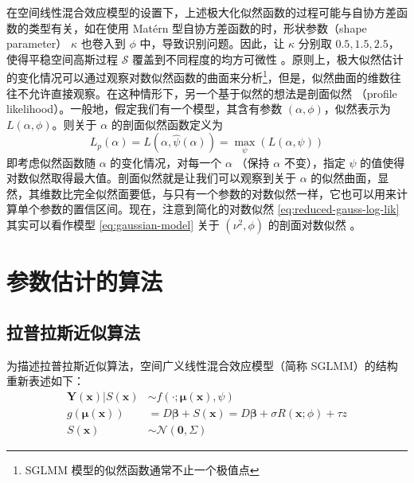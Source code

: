 \documentclass[12pt,a4paper,UTF8,twoside]{book}
\theoremstyle{definition}
\theoremstyle{definition}
\theoremstyle{definition}
\theoremstyle{remark}
\begin{document}
在空间线性混合效应模型的设置下，上述极大化似然函数的过程可能与自协方差函数的类型有关，如在使用
Matérn 型自协方差函数的时，形状参数（shape parameter） \(\kappa\)
也卷入到 \(\phi\) 中，导致识别问题。因此，让 \(\kappa\) 分别取
\(0.5,1.5,2.5\)，使得平稳空间高斯过程 \(\mathcal{S}\)
覆盖到不同程度的均方可微性
\citep{Warnes1987}。原则上，极大似然估计的变化情况可以通过观察对数似然函数的曲面来分析\footnote{SGLMM
  模型的似然函数通常不止一个极值点}，但是，似然曲面的维数往往不允许直接观察。在这种情形下，另一个基于似然的想法是剖面似然
（profile likelihood）。一般地，假定我们有一个模型，其含有参数
\((\alpha,\phi)\)，似然表示为 \(L(\alpha,\phi)\)。则关于 \(\alpha\)
的剖面似然函数定义为 \begin{equation}
L_{p}(\alpha) = L(\alpha,\hat{\psi}(\alpha)) = \max_{\psi} (L(\alpha,\psi))
\label{eq:profile-log-lik}
\end{equation} \noindent 即考虑似然函数随 \(\alpha\)
的变化情况，对每一个 \(\alpha\) （保持 \(\alpha\) 不变），指定 \(\psi\)
的值使得对数似然取得最大值。剖面似然就是让我们可以观察到关于 \(\alpha\)
的似然曲面，显然，其维数比完全似然面要低，与只有一个参数的对数似然一样，它也可以用来计算单个参数的置信区间。现在，注意到简化的对数似然
\eqref{eq:reduced-gauss-log-lik} 其实可以看作模型 \eqref{eq:gaussian-model}
关于 \((\nu^2,\phi)\) 的剖面对数似然 \citep{Diggle2007}。

\hypertarget{sec:algrithms}{%
\section{参数估计的算法}\label{sec:algrithms}}

\hypertarget{subsec:LA}{%
\subsection{拉普拉斯近似算法}\label{subsec:LA}}

为描述拉普拉斯近似算法，空间广义线性混合效应模型（简称
SGLMM）的结构重新表述如下： \begin{equation}
\begin{aligned}
\mathbf{Y(x)} | S(\mathbf{x}) & \sim  f(\cdot;\boldsymbol{\mu(x)},\psi) \\
g(\boldsymbol{\mu(x)}) & =  D\boldsymbol{\beta} + S(\mathbf{x}) 
                         = D\boldsymbol{\beta} + \sigma R(\mathbf{x};\phi) + \tau z \\
S(\mathbf{x}) & \sim  \mathcal{N}(\mathbf{0},\Sigma)
\end{aligned} \label{eq:sglmm}
\end{equation}
\end{document}
